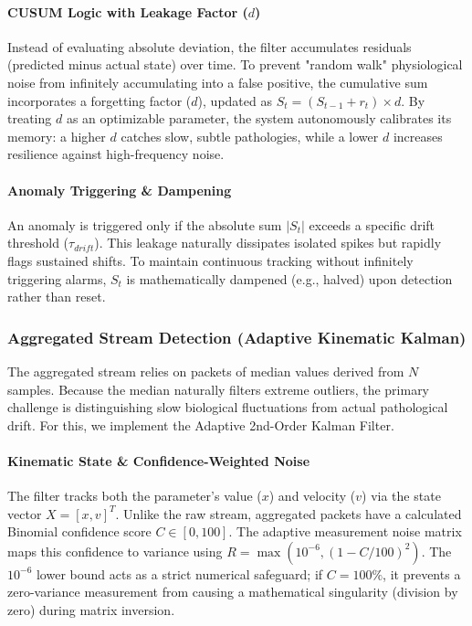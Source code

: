 \documentclass[sigconf]{acmart}
\begin{document}
\paragraph{CUSUM Logic with Leakage Factor ($d$)} Instead of evaluating absolute deviation, the filter accumulates residuals (predicted minus actual state) over time. To prevent "random walk" physiological noise from infinitely accumulating into a false positive, the cumulative sum incorporates a forgetting factor ($d$), updated as $S_t = (S_{t-1} + r_t) \times d$. By treating $d$ as an optimizable parameter, the system autonomously calibrates its memory: a higher $d$ catches slow, subtle pathologies, while a lower $d$ increases resilience against high-frequency noise. 

\paragraph{Anomaly Triggering \& Dampening} An anomaly is triggered only if the absolute sum $|S_t|$ exceeds a specific drift threshold ($\tau_{drift}$). This leakage naturally dissipates isolated spikes but rapidly flags sustained shifts. To maintain continuous tracking without infinitely triggering alarms, $S_t$ is mathematically dampened (e.g., halved) upon detection rather than reset.

\subsubsection{Aggregated Stream Detection (Adaptive Kinematic Kalman)}
The aggregated stream relies on packets of median values derived from $N$ samples. Because the median naturally filters extreme outliers, the primary challenge is distinguishing slow biological fluctuations from actual pathological drift. For this, we implement the Adaptive 2nd-Order Kalman Filter.

\paragraph{Kinematic State \& Confidence-Weighted Noise} The filter tracks both the parameter's value ($x$) and velocity ($v$) via the state vector $X = [x, v]^T$. Unlike the raw stream, aggregated packets have a calculated Binomial confidence score $C \in [0, 100]$. The adaptive measurement noise matrix maps this confidence to variance using $R = \max(10^{-6}, (1 - C/100)^2)$. The $10^{-6}$ lower bound acts as a strict numerical safeguard; if $C = 100\%$, it prevents a zero-variance measurement from causing a mathematical singularity (division by zero) during matrix inversion.
\end{document}
